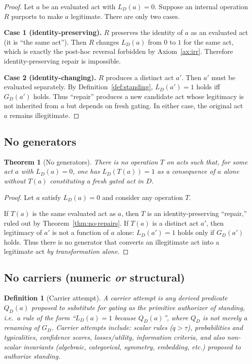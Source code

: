 \documentclass[12pt]{article}
\newtheorem{definition}{Definition}
\newtheorem{theorem}{Theorem}
\begin{document}
\begin{proof}
Let $a$ be an evaluated act with $L_D(a)=0$. Suppose an internal operation $R$ purports to make $a$ legitimate.
There are only two cases.

\textbf{Case 1 (identity-preserving).} $R$ preserves the identity of $a$ as an evaluated act (it is ``the same act'').
Then $R$ changes $L_D(a)$ from $0$ to $1$ for the same act, which is exactly the post-hoc reversal forbidden by Axiom~\ref{ax:irr}.
Therefore identity-preserving repair is impossible.

\textbf{Case 2 (identity-changing).} $R$ produces a distinct act $a'$. Then $a'$ must be evaluated separately.
By Definition~\ref{def:standing}, $L_D(a')=1$ holds iff $G_D(a')$ holds. Thus ``repair'' produces a new candidate act whose legitimacy is not inherited
from $a$ but depends on fresh gating. In either case, the original act $a$ remains illegitimate.
\end{proof}

\subsection{No generators}

\begin{theorem}[No generators]
\label{thm:no-generators}
There is no operation $T$ on acts such that, for some act $a$ with $L_D(a)=0$, one has $L_D(T(a))=1$ \emph{as a consequence of $a$ alone}
without $T(a)$ constituting a fresh gated act in $D$.
\end{theorem}

\begin{proof}
Let $a$ satisfy $L_D(a)=0$ and consider any operation $T$.

If $T(a)$ is the same evaluated act as $a$, then $T$ is an identity-preserving ``repair,'' ruled out by Theorem~\ref{thm:no-repairs}.
If $T(a)$ is a distinct act $a'$, then legitimacy of $a'$ is not a function of $a$ alone: $L_D(a')=1$ holds only if $G_D(a')$ holds.
Thus there is no generator that converts an illegitimate act into a legitimate act \emph{by transformation alone}.
\end{proof}

\subsection{No carriers (numeric \emph{or} structural)}

\begin{definition}[Carrier attempt]
A \emph{carrier attempt} is any derived predicate $Q_D(a)$ proposed to substitute for gating as the primitive authorizer of standing,
i.e.\ a rule of the form ``$L_D(a)=1$ because $Q_D(a)$'', where $Q_D$ is not merely a renaming of $G_D$.
Carrier attempts include: scalar rules ($q>\tau$), probabilities and typicalities, confidence scores, losses/utility, information criteria,
and also non-scalar invariants (algebraic, categorical, symmetry, embedding, etc.) proposed to authorize standing.
\end{definition}
\end{document}
